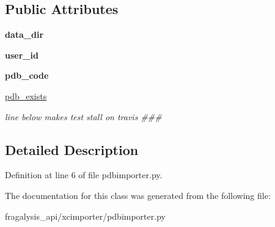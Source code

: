 \subsection*{Public Attributes}
\begin{DoxyCompactItemize}
\item 
\mbox{\label{classfragalysis__api_1_1xcimporter_1_1pdbimporter_1_1_import_pdb_a682ae0196455b3ba21d1f6f8083324ea}} 
{\bfseries data\+\_\+dir}
\item 
\mbox{\label{classfragalysis__api_1_1xcimporter_1_1pdbimporter_1_1_import_pdb_a4e8f2945727ef48feba2a568eab43b3b}} 
{\bfseries user\+\_\+id}
\item 
\mbox{\label{classfragalysis__api_1_1xcimporter_1_1pdbimporter_1_1_import_pdb_ab65dffc1f5b788b8d47cebf3a27ea08c}} 
{\bfseries pdb\+\_\+code}
\item 
\mbox{\label{classfragalysis__api_1_1xcimporter_1_1pdbimporter_1_1_import_pdb_a32f7fbde8f3a111497280a932de510e6}} 
\hyperlink{classfragalysis__api_1_1xcimporter_1_1pdbimporter_1_1_import_pdb_a32f7fbde8f3a111497280a932de510e6}{pdb\+\_\+exists}
\begin{DoxyCompactList}\small\item\em line below makes test stall on travis \#\#\# \end{DoxyCompactList}\end{DoxyCompactItemize}


\subsection{Detailed Description}


Definition at line 6 of file pdbimporter.\+py.



The documentation for this class was generated from the following file\+:\begin{DoxyCompactItemize}
\item 
fragalysis\+\_\+api/xcimporter/pdbimporter.\+py\end{DoxyCompactItemize}
